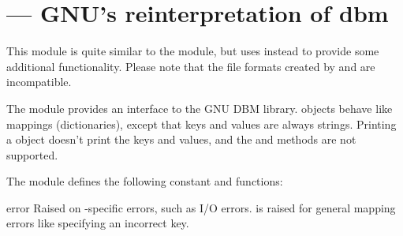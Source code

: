 \section{ ---
         GNU's reinterpretation of dbm}



%
%

This module is quite similar to the 
module, but uses  instead to provide some additional
functionality.  Please note that the file formats created by
 and  are incompatible.

The  module provides an interface to the GNU DBM
library.   objects behave like mappings
(dictionaries), except that keys and values are always strings.
Printing a  object doesn't print the keys and values, and
the  and  methods are not supported.

The module defines the following constant and functions:

\begin{excdesc}{error}
Raised on -specific errors, such as I/O errors.
 is raised for general mapping errors like
specifying an incorrect key.
\end{excdesc}

